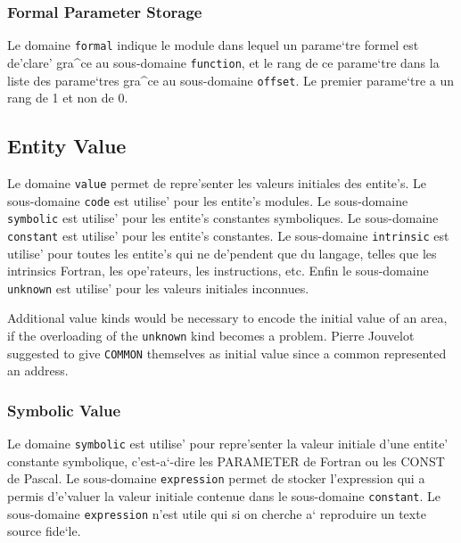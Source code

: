 \subsubsection{Formal Parameter Storage}
\label{subsubsection-formal}

{
Le domaine \verb/formal/ indique le module dans lequel un parame`tre formel
est de'clare' gra^ce au sous-domaine \verb/function/, et le rang de ce
parame`tre dans la liste des parame`tres gra^ce au sous-domaine
\verb/offset/.
Le premier parame`tre a un rang de 1 et non de 0.
}

\subsection{Entity Value}
\label{subsection-value}

{
Le domaine \verb/value/ permet de repre'senter les
valeurs initiales des entite's. Le sous-domaine \verb/code/ est utilise'
pour les entite's modules. Le sous-domaine \verb/symbolic/ est utilise'
pour les entite's constantes symboliques. Le sous-domaine
\verb/constant/ est utilise' pour les entite's constantes. Le
sous-domaine \verb/intrinsic/ est utilise' pour toutes les entite's qui
ne de'pendent que du langage, telles que les intrinsics Fortran, les
ope'rateurs, les instructions, etc. Enfin le sous-domaine
\verb/unknown/ est utilise' pour les valeurs initiales inconnues.

Additional value kinds would be necessary to encode the initial value of
an area, if the overloading of the \verb+unknown+ kind becomes a
problem. Pierre Jouvelot suggested to give \verb+COMMON+ themselves as
initial value since a common represented an address.
}

\subsubsection{Symbolic Value}
\label{subsubsection-symbolic}

{
Le domaine \verb/symbolic/ est utilise' pour repre'senter la valeur
initiale d'une entite' constante symbolique, c'est-a`-dire les PARAMETER
de Fortran ou les CONST de Pascal. Le sous-domaine \verb/expression/
permet de stocker l'expression qui a permis d'e'valuer la valeur
initiale contenue dans le sous-domaine \verb/constant/. Le sous-domaine
\verb/expression/ n'est utile qui si on cherche a` reproduire un texte
source fide`le.
}

